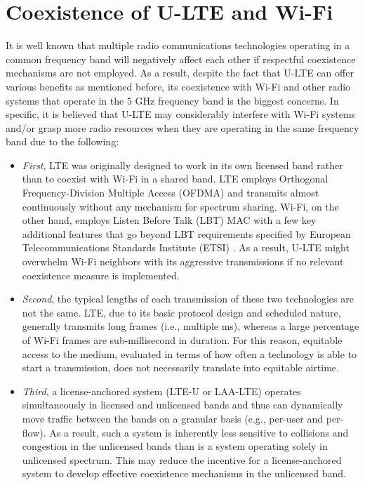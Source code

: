 \section{Coexistence of U-LTE and Wi-Fi}
\label{coexist}
It is well known that multiple radio communications technologies operating in a common frequency band will negatively affect each other if respectful coexistence mechanisms are not employed. As a result, despite the fact that U-LTE can offer various benefits as mentioned before, its coexistence with Wi-Fi and other radio systems that operate in the $5$ GHz frequency band is the biggest concerns. In specific, it is believed that U-LTE may considerably interfere with Wi-Fi systems and/or grasp more radio resources when they are operating in the same frequency band due to the following:
\begin{itemize}
\item \textit{First}, LTE was originally designed to work in its own licensed band rather than to coexist with Wi-Fi in a shared band. LTE employs Orthogonal Frequency-Division Multiple Access (OFDMA) and transmits almost continuously without any mechanism for spectrum sharing. Wi-Fi, on the other hand, employs Listen Before Talk (LBT) MAC with a few key additional features that go beyond LBT requirements specified by European Telecommunications Standards Institute (ETSI) \cite{LBT-ETSI-2014}. As a result, U-LTE might overwhelm Wi-Fi neighbors with its aggressive transmissions if no relevant coexistence measure is implemented.

\item \textit{Second}, the typical lengths of each transmission of these two technologies are not the same. LTE, due to its basic protocol design and scheduled nature, generally transmits long frames (i.e., multiple ms), whereas a large percentage of Wi-Fi frames are sub-millisecond in duration. For this reason, equitable access to the medium, evaluated in terms of how often a technology is able to start a transmission, does not necessarily translate into equitable airtime.

\item \textit{Third}, a license-anchored system (LTE-U or LAA-LTE) operates simultaneously in licensed and unlicensed bands and thus can dynamically move traffic between the bands on a granular basis (e.g., per-user and per-flow). As a result, such a system is inherently less sensitive to collisions and congestion in the unlicensed bands than is a system operating solely in unlicensed spectrum. This may reduce the incentive for a license-anchored system to develop effective coexistence mechanisms in the unlicensed band.
\end{itemize}

